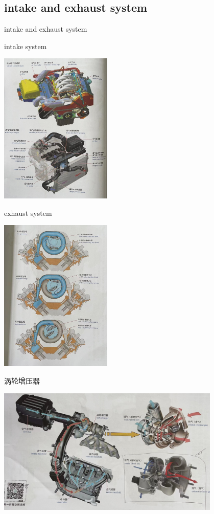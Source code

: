 \subsection{intake and exhaust system}
\begin{frame}{intake and exhaust system}
	\begin{block}{intake system}
		\begin{center}
			\includegraphics[width=0.4\textwidth]{2-27}
		\end{center}
	\end{block}
\end{frame}
\begin{frame}
	\begin{block}{exhaust system}
		\begin{center}
			\includegraphics[width=0.4\textwidth]{2-28}
		\end{center}
	\end{block}
\end{frame}
\begin{frame}
	\begin{block}{涡轮增压器}
		\begin{center}
			\includegraphics[width=0.8\textwidth]{2-29}
		\end{center}
	\end{block}
\end{frame}

